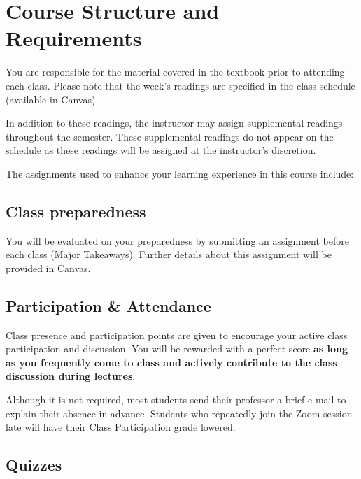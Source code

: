 \documentclass[11pt,]{article}
\begin{document}
\hypertarget{course-structure-and-requirements}{%
\section{Course Structure and
Requirements}\label{course-structure-and-requirements}}

You are responsible for the material covered in the textbook prior to
attending each class. Please note that the week's readings are specified
in the class schedule (available in Canvas).

In addition to these readings, the instructor may assign supplemental
readings throughout the semester. These supplemental readings do not
appear on the schedule as these readings will be assigned at the
instructor's discretion.

The assignments used to enhance your learning experience in this course
include:

\hypertarget{class-preparedness}{%
\subsection{Class preparedness}\label{class-preparedness}}

You will be evaluated on your preparedness by submitting an assignment
before each class (Major Takeaways). Further details about this
assignment will be provided in Canvas.

\hypertarget{participation-attendance}{%
\subsection{Participation \&
Attendance}\label{participation-attendance}}

Class presence and participation points are given to encourage your
active class participation and discussion. You will be rewarded with a
perfect score \textbf{as long as you frequently come to class and
actively contribute to the class discussion during lectures}.

Although it is not required, most students send their professor a brief
e-mail to explain their absence in advance. Students who repeatedly join
the Zoom session late will have their Class Participation grade lowered.

\hypertarget{quizzes}{%
\subsection{Quizzes}\label{quizzes}}
\end{document}
